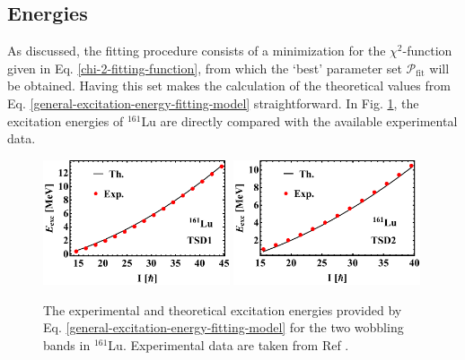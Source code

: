 \subsection{Energies}

As discussed, the fitting procedure consists of a minimization for the $\chi^2$-function given in Eq. \ref{chi-2-fitting-function}, from which the `best' parameter set $\mathcal{P}_\text{fit}$ will be obtained. Having this set makes the  calculation of the theoretical values from Eq. \ref{general-excitation-energy-fitting-model} straightforward. In Fig. \ref{excitation-energies-th-161Lu}, the excitation energies of $^{161}$Lu are directly compared with the available experimental data.
\begin{figure}
    \centering
    \includegraphics[width=0.49\textwidth]{Chapters/Figures/Lu-exp-energies/fig2a_lu161.pdf}
    \includegraphics[width=0.49\textwidth]{Chapters/Figures/Lu-exp-energies/fig2b_lu161.pdf}
    \caption{The experimental and theoretical excitation energies provided by Eq. \ref{general-excitation-energy-fitting-model} for the two wobbling bands in $^{161}$Lu. Experimental data are taken from Ref \cite{bringel2005evidence}.}
    \label{excitation-energies-th-161Lu}
\end{figure}

